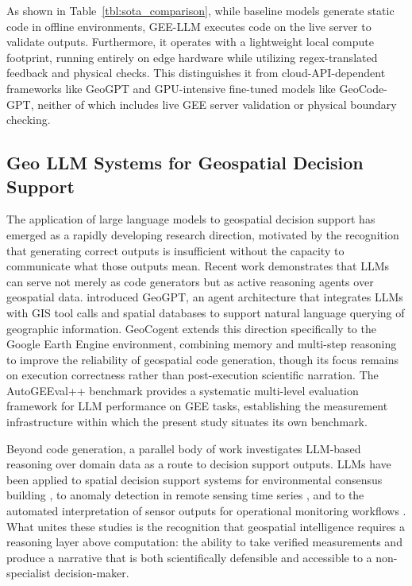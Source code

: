 \documentclass[pdflatex,sn-mathphys-ay]{sn-jnl}
\begin{document}
As shown in Table~\ref{tbl:sota_comparison}, while baseline models generate static code in offline environments, GEE-LLM executes code on the live server to validate outputs. Furthermore, it operates with a lightweight local compute footprint, running entirely on edge hardware while utilizing regex-translated feedback and physical checks. This distinguishes it from cloud-API-dependent frameworks like GeoGPT and GPU-intensive fine-tuned models like GeoCode-GPT, neither of which includes live GEE server validation or physical boundary checking.

\subsection{Geo LLM Systems for Geospatial Decision Support}\label{sec:rel_decision}
The application of large language models to geospatial decision support has emerged as a rapidly developing research direction, motivated by the recognition that generating correct outputs is insufficient without the capacity to communicate what those outputs mean. Recent work demonstrates that LLMs can serve not merely as code generators but as active reasoning agents over geospatial data. \citet{Zhang2024} introduced GeoGPT, an agent architecture that integrates LLMs with GIS tool calls and spatial databases to support natural language querying of geographic information. GeoCogent \citep{hou2026geocogent} extends this direction specifically to the Google Earth Engine environment, combining memory and multi-step reasoning to improve the reliability of geospatial code generation, though its focus remains on execution correctness rather than post-execution scientific narration. The AutoGEEval++ benchmark \citep{AutoGEEvalPlusPlus2025} provides a systematic multi-level evaluation framework for LLM performance on GEE tasks, establishing the measurement infrastructure within which the present study situates its own benchmark.

Beyond code generation, a parallel body of work investigates LLM-based reasoning over domain data as a route to decision support outputs. LLMs have been applied to spatial decision support systems for environmental consensus building \citep{Calleo2025}, to anomaly detection in remote sensing time series \citep{TranDubois2025}, and to the automated interpretation of sensor outputs for operational monitoring workflows \citep{Jin2024}. What unites these studies is the recognition that geospatial intelligence requires a reasoning layer above computation: the ability to take verified measurements and produce a narrative that is both scientifically defensible and accessible to a non-specialist decision-maker.
\end{document}
